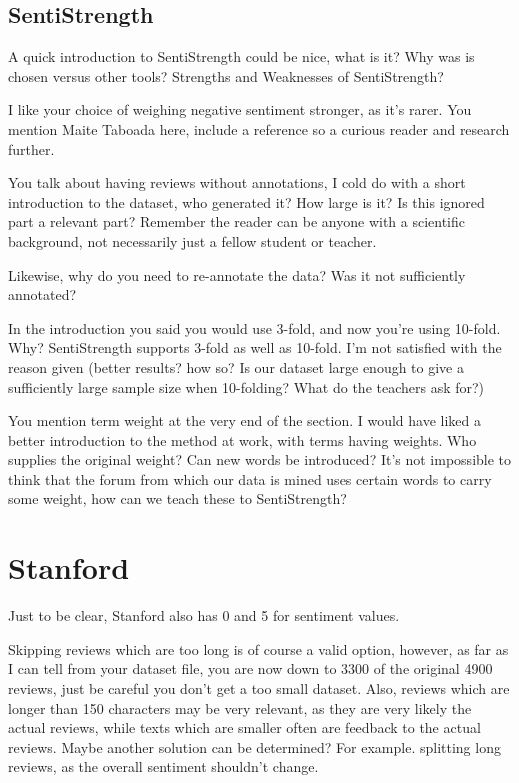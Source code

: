 \documentclass[11pt]{article} %
\begin{document}
\subsection*{SentiStrength}
A quick introduction to SentiStrength could be nice, what is it? Why was is chosen versus other tools? Strengths and Weaknesses of SentiStrength?

I like your choice of weighing negative sentiment stronger, as it's rarer. You mention Maite Taboada here, include a reference so a curious reader and research further.

You talk about having reviews without annotations, I cold do with a short introduction to the dataset, who generated it? How large is it? Is this ignored part a relevant part? Remember the reader can be anyone with a scientific background, not necessarily just a fellow student or teacher.

Likewise, why do you need to re-annotate the data? Was it not sufficiently annotated?

In the introduction you said you would use 3-fold, and now you're using 10-fold. Why? SentiStrength supports 3-fold as well as 10-fold. I'm not satisfied with the reason given (better results? how so? Is our dataset large enough to give a sufficiently large sample size when 10-folding? What do the teachers ask for?)

You mention term weight at the very end of the section. I would have liked a better introduction to the method at work, with terms having weights. Who supplies the original weight? Can new words be introduced? It's not impossible to think that the forum from which our data is mined uses certain words to carry some weight, how can we teach these to SentiStrength?

\section*{Stanford}
Just to be clear, Stanford also has 0 and 5 for sentiment values.

Skipping reviews which are too long is of course a valid option, however, as far as I can tell from your dataset file, you are now down to 3300 of the original 4900 reviews, just be careful you don't get a too small dataset. Also, reviews which are longer than 150 characters may be very relevant, as they are very likely the actual reviews, while texts which are smaller often are feedback to the actual reviews. Maybe another solution can be determined? For example. splitting long reviews, as the overall sentiment shouldn't change.
\end{document}
